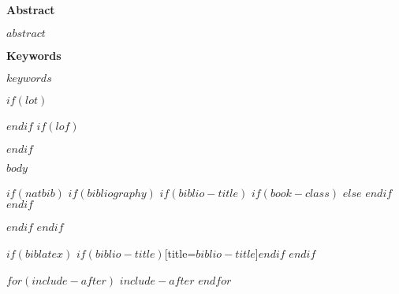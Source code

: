 \documentclass[twoside,12pt,a4paper]{$documentclass$}
\title{
    \vspace{-1.5cm}
    \newfontfamily{\title}{title.ttf}
    {\fontsize{52}{52}\selectfont\title $title$}
    $if(subtitle)$
      \\ \vspace{1cm}
      \parbox{14cm}{
        \begin{center}
          {\fontsize{24}{56}\selectfont\bfseries $subtitle$}
        \end{center}
      }
    $endif$
  }
\author{{\LARGE\bfseries
    $for(author)$
      \uppercase{$author$} $sep$ \and
    $endfor$
  }}
\date{\vspace{-1em} \LARGE\bfseries\MakeUppercase $date$}
\begin{document}
  \maketitle
  \thispagestyle{empty}
  \vspace{0.5cm}
  \begin{center}\textbf{Abstract}\\\end{center}\vspace{-1em}
  $abstract$
  \\
  \begin{center}\textbf{Keywords}\\\end{center}\vspace{-1em}
  $keywords$
  \newpage

\thispagestyle{empty}
{
  \hypersetup{linkcolor=$if(toccolor)$$toccolor$$else$black$endif$}
  \setcounter{tocdepth}{$toc-depth$}
  \tableofcontents
}
\restoregeometry
\newpage

$if(lot)$
\listoftables
$endif$
$if(lof)$
\listoffigures
$endif$


\setcounter{page}{1}
$body$

$if(natbib)$
  $if(bibliography)$
    $if(biblio-title)$
      $if(book-class)$
        \renewcommand\bibname{$biblio-title$}
      $else$
        \renewcommand\refname{$biblio-title$}
      $endif$
    $endif$
    
  $endif$
$endif$

$if(biblatex)$
  \printbibliography$if(biblio-title)$[title=$biblio-title$]$endif$
$endif$

$for(include-after)$
  $include-after$
$endfor$
\end{document}
